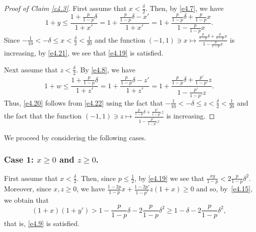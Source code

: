 \documentclass[10pt]{amsart}
\theoremstyle{remark}
\newcommand{\meg}{\geqslant}
\newcommand{\mik}{\leqslant}
\begin{document}
\begin{proof}[Proof of Claim \emph{\ref{c4.3}}]
First assume that $x<\frac{\delta}{2}$. Then, by \eqref{e4.7}, we have
\begin{equation} \label{e4.21}
1+y\mik \frac{1+\frac{p}{1-p}\delta}{1+x'}=
1+\frac{\frac{p}{1-p}\delta-x'}{1+x'}=
1+\frac{\frac{p}{1-p}\delta+\frac{p}{1-p}x}{1-\frac{p}{1-p}x}.
\end{equation}
Since $-\frac{1}{10}<-\delta\mik x<\frac{\delta}{2}<\frac{1}{20}$ and the function
$(-1,1)\ni x\mapsto \frac{\frac{p}{1-p}\delta+\frac{p}{1-p}x}{1-\frac{p}{1-p}x}$ is increasing,
by \eqref{e4.21}, we see that \eqref{e4.19} is satisfied.

Next assume that $z<\frac{\delta}{2}$. By \eqref{e4.8}, we have
\begin{equation} \label{e4.22}
1+w \mik \frac{1+\frac{p}{1-p}\delta}{1+z'} = 1+\frac{\frac{p}{1-p}\delta-z'}{1+z'}=
1+\frac{\frac{p}{1-p}\delta+\frac{p'}{1-p'}z}{1-\frac{p'}{1-p'}z}.
\end{equation}
Thus, \eqref{e4.20} follows from \eqref{e4.22} using the fact that
$-\frac{1}{10}<-\delta\mik z< \frac{\delta}{2}<\frac{1}{20}$ and the fact that the function
$(-1,1)\ni z\mapsto \frac{\frac{p}{1-p}\delta+\frac{p'}{1-p'}z}{1-\frac{p'}{1-p'}z}$ is increasing.
\end{proof}

We proceed by considering the following cases.

\subsubsection*{Case 1: $x\meg 0$ and $z\meg 0$.} First assume that $x<\frac{\delta}{2}$.
Then, since $p\mik \frac{1}{2}$, by \eqref{e4.19} we see that $\frac{xy}{1-p}< 2\frac{p}{1-p}\delta^2$.
Moreover, since $x,z\meg 0$, we have $\frac{1-2p}{1-p}x+\frac{1-2p'}{1-p'}z(1+x)\meg 0$ and so, by~\eqref{e4.15},
we obtain that
\begin{equation} \label{e4.23}
(1+x)(1+y')> 1-\frac{p}{1-p}\delta-2\frac{p}{1-p}\delta^2\meg 1-\delta-2\frac{p}{1-p}\delta^2,
\end{equation}
that is, \eqref{e4.9} is satisfied.
\end{document}
